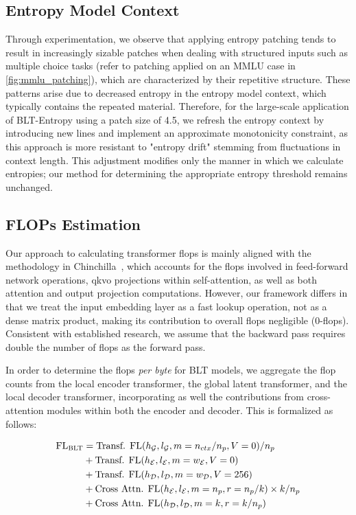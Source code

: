 \subsection{Entropy Model Context}
\label{section:entropy-context}
Through experimentation, we observe that applying entropy patching tends to result in increasingly sizable patches when dealing with structured inputs such as multiple choice tasks (refer to patching applied on an MMLU case in \autoref{fig:mmlu_patching}), which are characterized by their repetitive structure. These patterns arise due to decreased entropy in the entropy model context, which typically contains the repeated material. Therefore, for the large-scale application of {\textsc BLT}-Entropy using a patch size of 4.5, we refresh the entropy context by introducing new lines and implement an approximate monotonicity constraint, as this approach is more resistant to "entropy drift" stemming from fluctuations in context length. This adjustment modifies only the manner in which we calculate entropies; our method for determining the appropriate entropy threshold remains unchanged.

\subsection{FLOPs Estimation} 
\label{section:flops}

Our approach to calculating transformer flops is mainly aligned with the methodology in Chinchilla~\citep{hoffmann2022training}, which accounts for the flops involved in feed-forward network operations, qkvo projections within self-attention, as well as both attention and output projection computations. However, our framework differs in that we treat the input embedding layer as a fast lookup operation, not as a dense matrix product, making its contribution to overall flops negligible (0-flops). Consistent with established research, we assume that the backward pass requires double the number of flops as the forward pass.

In order to determine the flops \textit{per byte} for {\textsc BLT} models, we aggregate the flop counts from the local encoder transformer, the global latent transformer, and the local decoder transformer, incorporating as well the contributions from cross-attention modules within both the encoder and decoder. This is formalized as follows:

\begin{align}
    \text{FL}_{\text{{\textsc BLT}}} &= \text{Transf. FL}(h_{\mathcal{G}}, l_{\mathcal{G}}, m=n_{ctx}/n_p,V=0) / n_p\\
   &+\text{Transf. FL}(h_{\mathcal{E}}, l_{\mathcal{E}}, m=w_{\mathcal{E}}, V=0) \\
   &+ \text{Transf. FL}(h_{\mathcal{D}}, l_{\mathcal{D}}, m=w_{\mathcal{D}}, V=256) \\ 
    &+ \text{Cross Attn. FL}(h_{\mathcal{E}}, l_{\mathcal{E}}, m=n_p, r=n_p/k) \times k/n_p \\ 
   &+ \text{Cross Attn. FL}(h_{\mathcal{D}}, l_{\mathcal{D}}, m=k, r=k/n_p) 
\end{align}

